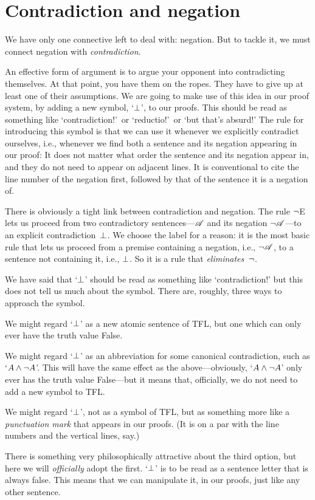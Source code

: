 \section{Contradiction and negation}\label{sec:contradiction}

We have only one connective left to deal with: negation. But to tackle it, we must connect negation with \emph{contradiction}.

An effective form of argument is to argue your opponent into contradicting themselves. At that point, you have them on the ropes. They have to give up at least one of their assumptions. We are going to make use of this idea in our proof system, by adding a new symbol, `$\bot$', to our proofs. This should be read as something like `contradiction!'\ or `reductio!'\ or `but that's absurd!'  The rule for introducing this symbol is that we can use it whenever we explicitly contradict ourselves, i.e., whenever we find both a sentence and its negation appearing in our proof:
It does not matter what order the sentence and its negation appear in,
and they do not need to appear on adjacent lines. It is conventional
to cite the line number of the negation first, followed by that of the
sentence it is a negation of.

There is obviously a tight link between contradiction and negation.
The rule $\neg$E lets us proceed from two contradictory sentences---$\mathscr{A}$ and its negation $\neg \mathscr{A}$---to an explicit contradiction~$\bot$. We choose the label for a reason: it is the most basic rule that lets us proceed from a premise containing a negation, i.e., $\neg\mathscr{A}$, to a sentence not containing it, i.e., $\bot$. So it is a rule that \emph{eliminates}~$\neg$.

We have said that `$\bot$' should be read as something like `contradiction!' but this does not tell us much about the symbol. There are, roughly, three ways to approach the symbol.
	\begin{compactlist}
		\item We might regard `$\bot$' as a new atomic sentence of TFL, but one which can only ever have the truth value False.
		\item We might regard `$\bot$' as an abbreviation for some canonical contradiction, such as `$A \wedge \neg A$'. This will have the same effect as the above---obviously, `$A \wedge \neg A$' only ever has the truth value False---but it means that, officially, we do not need to add a new symbol to TFL.
		\item We might regard `$\bot$', not as a symbol of TFL, but as something more like a \emph{punctuation mark} that appears in our proofs. (It is on a par with the line numbers and the vertical lines, say.)
	\end{compactlist}
There is something very philosophically attractive about the third option, but here we will \emph{officially} adopt the first. `$\bot$' is to be read as a sentence letter that is always false. This means that we can manipulate it, in our proofs, just like any other sentence.

